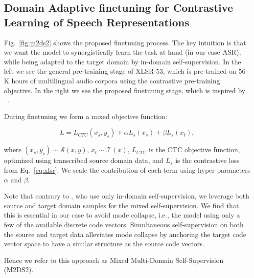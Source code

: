 \documentclass[journal]{IEEEtran}
\begin{document}
\subsection{Domain Adaptive finetuning for Contrastive Learning of Speech Representations}
\label{sec:m2ds2-approach}

Fig.~\ref{fig:m2ds2} shows the proposed finetuning process. The key intuition is that we want the model to synergistically learn the task at hand (in our case ASR), while being adapted to the target domain by in-domain self-supervision.
In the left we see the general pre-training stage of XLSR-53, which is pre-trained on $56$K hours of multilingual audio corpora using the contrastive pre-training objective. In the right we see the proposed finetuning stage, which is inspired by ~\cite{karouzos-etal-2021-udalm}.

During finetuning we form a mixed objective function:

\begin{equation}
\label{eq:m2ds2-loss}
L = L_{CTC}(x_s, y_s) + \alpha L_{s}(x_s) +  \beta L_{s}(x_t),
\end{equation}

where $(x_s, y_s) \sim \mathcal{S}(x,y)$, $x_t \sim \mathcal{T}(x)$, $L_{CTC}$ is the CTC objective function, optimized using transcribed source domain data, and $L_{s}$ is the contrastive loss from Eq.~\eqref{eq:xlsr}. We scale the contribution of each term using hyper-parameters $\alpha$ and $\beta$.

Note that contrary to \cite{karouzos-etal-2021-udalm}, who use only in-domain self-supervision, we leverage both source and target domain samples for the mixed self-supervision. We find that this is essential in our case to avoid mode collapse, i.e., the model using only a few of the available discrete code vectors. Simultaneous self-supervision on both the source and target data alleviates mode collapse by anchoring the target code vector space to have a similar structure as the source code vectors.


Hence we refer to this approach as Mixed Multi-Domain Self-Supervision (M2DS2).
\end{document}

